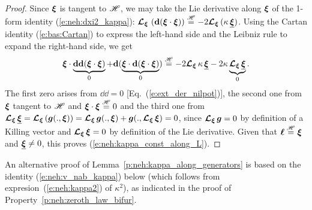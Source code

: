 \begin{proof}
Since $\bm{\xi}$ is tangent to $\mathscr{H}$, we may take
the Lie derivative along $\bm{\xi}$ of the 1-form identity (\ref{e:neh:dxi2_kappa}):
$\bm{\mathcal{L}}_{\bm{\xi}}\, \left( \mathbf{d} (\bm{\xi}\cdot\bm{\xi}) \right) \stackrel{\mathscr{H}}{=} - 2 \bm{\mathcal{L}}_{\bm{\xi}}\, ( \kappa \, \underline{\bm{\xi}})$. Using the Cartan identity (\ref{e:bas:Cartan}) to express the left-hand side and
the Leibniz rule to expand the right-hand side, we get
\[
    \bm{\xi} \cdot \underbrace{\mathbf{d} \mathbf{d} (\bm{\xi}\cdot\bm{\xi})}_{0}
    + \mathbf{d} ( \underbrace{\bm{\xi}\cdot\mathbf{d}(\bm{\xi}\cdot\bm{\xi})}_{0} )
    \stackrel{\mathscr{H}}{=} - 2 \bm{\mathcal{L}}_{\bm{\xi}}\, \kappa \, \underline{\bm{\xi}} - 2 \kappa \underbrace{\bm{\mathcal{L}}_{\bm{\xi}}\, \underline{\bm{\xi}}}_{0}  .
\]
The first zero arises from $\dd\dd = 0$ [Eq.~(\ref{e:ext_der_nilpot})], the second
one from $\bm{\xi}$ tangent to $\mathscr{H}$ and $\bm{\xi}\cdot\bm{\xi} \stackrel{\mathscr{H}}{=} 0$ and
the third one from
$\bm{\mathcal{L}}_{\bm{\xi}}\, \underline{\bm{\xi}} = \bm{\mathcal{L}}_{\bm{\xi}}\,(\bm{g}(.,\bm{\xi})) = \bm{\mathcal{L}}_{\bm{\xi}}\,\bm{g}(.,\bm{\xi}) +
\bm{g}(., \bm{\mathcal{L}}_{\bm{\xi}}\,\bm{\xi})=0$, since $\bm{\mathcal{L}}_{\bm{\xi}}\,\bm{g} = 0$ by definition of a Killing vector
and $\bm{\mathcal{L}}_{\bm{\xi}}\,\bm{\xi}=0$ by definition of the Lie derivative. Given that
$\bm{\ell} \stackrel{\mathscr{H}}{=} \bm{\xi}$ and $\underline{\bm{\xi}}\neq 0$, this proves (\ref{e:neh:kappa_const_along_L}).
\end{proof}

\begin{remark}
An alternative proof of Lemma~\ref{p:neh:kappa_along_generators} is based on the identity (\ref{e:neh:v_nab_kappa}) below (which follows from expresion~(\ref{e:neh:kappa2}) of $\kappa^2$),
as indicated in the proof of Property~\ref{p:neh:zeroth_law_bifur}.
\end{remark}

